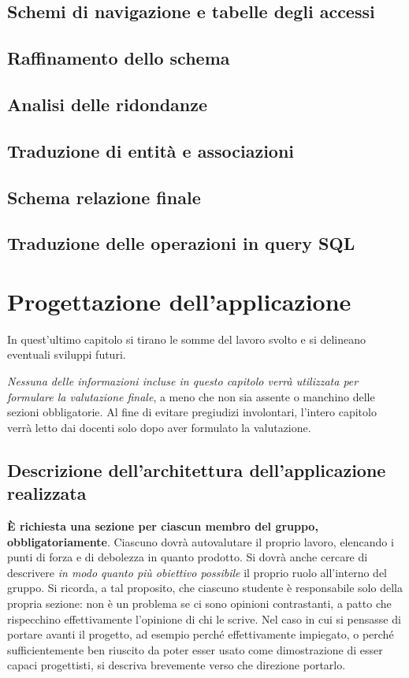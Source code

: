 \documentclass[a4paper,12pt]{report}
\begin{document}
\section{Schemi di navigazione e tabelle degli accessi}
\section{Raffinamento dello schema}
\section{Analisi delle ridondanze}
\section{Traduzione di entità e associazioni}
\section{Schema relazione finale}
\section{Traduzione delle operazioni in query SQL}
\chapter{Progettazione dell'applicazione}

In quest'ultimo capitolo si tirano le somme del lavoro svolto e si delineano eventuali sviluppi
futuri.

\textit{Nessuna delle informazioni incluse in questo capitolo verrà utilizzata per formulare la valutazione finale}, a meno che non sia assente o manchino delle sezioni obbligatorie.
%
Al fine di evitare pregiudizi involontari, l'intero capitolo verrà letto dai docenti solo dopo aver formulato la valutazione.

\section{Descrizione dell'architettura dell'applicazione realizzata}

\textbf{È richiesta una sezione per ciascun membro del gruppo, obbligatoriamente}.
%
Ciascuno dovrà autovalutare il proprio lavoro, elencando i punti di forza e di debolezza in quanto prodotto.
Si dovrà anche cercare di descrivere \emph{in modo quanto più obiettivo possibile} il proprio ruolo all'interno del gruppo.
Si ricorda, a tal proposito, che ciascuno studente è responsabile solo della propria sezione: non è un problema se ci sono opinioni contrastanti, a patto che rispecchino effettivamente l'opinione di chi le scrive.
Nel caso in cui si pensasse di portare avanti il progetto, ad esempio perché effettivamente impiegato, o perché sufficientemente ben riuscito da poter esser usato come dimostrazione di esser capaci progettisti, si descriva brevemente verso che direzione portarlo.
\end{document}
